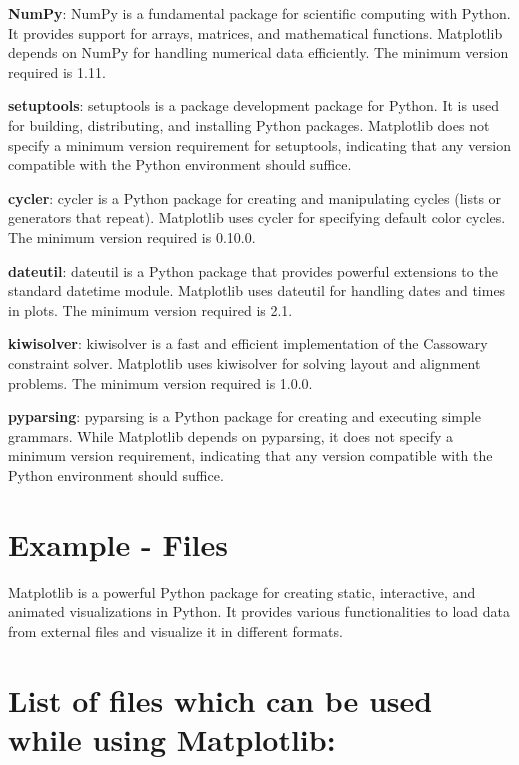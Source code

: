 \textbf{NumPy}: NumPy is a fundamental package for scientific computing with Python. It provides support for arrays, matrices, and mathematical functions. Matplotlib depends on NumPy for handling numerical data efficiently. The minimum version required is 1.11.

\textbf{setuptools}: setuptools is a package development package for Python. It is used for building, distributing, and installing Python packages. Matplotlib does not specify a minimum version requirement for setuptools, indicating that any version compatible with the Python environment should suffice.

\textbf{cycler}: cycler is a Python package for creating and manipulating cycles (lists or generators that repeat). Matplotlib uses cycler for specifying default color cycles. The minimum version required is 0.10.0.

\textbf{dateutil}: dateutil is a Python package that provides powerful extensions to the standard datetime module. Matplotlib uses dateutil for handling dates and times in plots. The minimum version required is 2.1.

\textbf{kiwisolver}: kiwisolver is a fast and efficient implementation of the Cassowary constraint solver. Matplotlib uses kiwisolver for solving layout and alignment problems. The minimum version required is 1.0.0.

\textbf{pyparsing}: pyparsing is a Python package for creating and executing simple grammars. While Matplotlib depends on pyparsing, it does not specify a minimum version requirement, indicating that any version compatible with the Python environment should suffice.

\section{Example - Files}

Matplotlib is a powerful Python package for creating static, interactive, and animated visualizations in Python. It provides various functionalities to load data from external files and visualize it in different formats.

\section*{List of files which can be used while using Matplotlib:}

